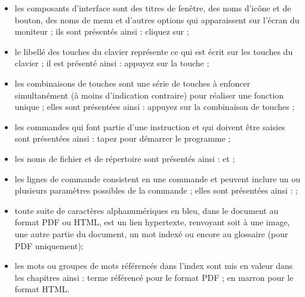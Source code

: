 \begin{itemize}
	\item les composants d'interface sont des titres de fenêtre, des noms d'icône et de bouton, des noms de menu et d'autres options qui apparaissent sur l'écran du moniteur ; ils sont présentés ainsi : \newline
\hspace*{1.5cm}cliquez sur  ;
	\item le libellé des touches du clavier représente ce qui est écrit sur les touches du clavier ; il est présenté ainsi : \newline
\hspace*{1.5cm}appuyez sur la touche  ;	
	\item les combinaisons de touches sont une série de touches à enfoncer 	simultanément (à moins d'indication contraire) pour réaliser une fonction 	unique ; elles sont présentées ainsi : \newline
\hspace*{1.5cm}appuyez sur la combinaison de touches  ;
	\item les commandes qui font partie d'une instruction et qui doivent être saisies sont présentées ainsi : \newline
\hspace*{1.5cm}tapez  pour démarrer le programme ;
	\item les noms de fichier et de répertoire sont présentés ainsi : \newline
\hspace*{1.5cm} et  ;	
	\item les lignes de commande consistent en une commande et peuvent inclure un ou plusieurs paramètres possibles de la commande ; elles sont présentées ainsi :  \newline
\hspace*{1.5cm}	 ;
	\item toute suite de caractères alphanumériques en bleu, dans le document au format PDF ou HTML, est un lien hypertexte, renvoyant soit à une image, une autre partie du document, un mot indexé ou encore au glossaire (pour PDF uniquement);
	\item les mots ou groupes de mots référencés dans l'index sont mis en valeur dans les chapitres ainsi : \newline
\hspace*{1.5cm}	\textsf{terme référencé} pour le format PDF ; \newline 
\hspace*{1.5cm} en marron pour le format HTML. 
\end{itemize}

